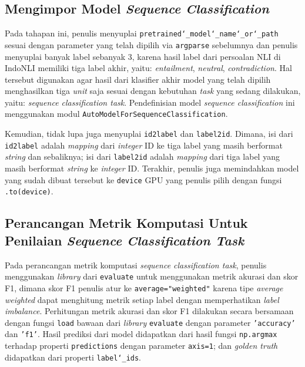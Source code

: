 \subsection{Mengimpor Model \emph{Sequence Classification}}
Pada tahapan ini, penulis menyuplai \texttt{pretrained\char`_model\char`_name\char`_or\char`_path} sesuai dengan parameter yang telah dipilih via \texttt{argparse} sebelumnya dan penulis menyuplai banyak label sebanyak 3, karena hasil label dari persoalan NLI di IndoNLI memiliki tiga label akhir, yaitu: \emph{entailment}, \emph{neutral}, \emph{contradiction}. Hal tersebut digunakan agar hasil dari klasifier akhir model yang telah dipilih menghasilkan tiga \emph{unit} saja sesuai dengan kebutuhan \emph{task} yang sedang dilakukan, yaitu: \emph{sequence classification task}. Pendefinisian model \emph{sequence classification} ini menggunakan modul \texttt{AutoModelForSequenceClassification}.

Kemudian, tidak lupa juga menyuplai \texttt{id2label} dan \texttt{label2id}. Dimana, isi dari \texttt{id2label} adalah \emph{mapping} dari \emph{integer} ID ke tiga label yang masih berformat \emph{string} dan sebaliknya; isi dari \texttt{label2id} adalah \emph{mapping} dari tiga label yang masih berformat \emph{string} ke \emph{integer} ID. Terakhir, penulis juga memindahkan model yang sudah dibuat tersebut ke \texttt{device} GPU yang penulis pilih dengan fungsi \texttt{.to(device)}.

\subsection{Perancangan Metrik Komputasi Untuk Penilaian \emph{Sequence Classification Task}}
Pada perancangan metrik komputasi \emph{sequence classification task}, penulis menggunakan \emph{library} dari \texttt{evaluate} untuk menggunakan metrik akurasi dan skor F1, dimana skor F1 penulis atur ke \texttt{average="weighted"} karena tipe \emph{average weighted} dapat menghitung metrik setiap label dengan memperhatikan \emph{label imbalance}. Perhitungan metrik akurasi dan skor F1 dilakukan secara bersamaan dengan fungsi \texttt{load} bawaan dari \emph{library} \texttt{evaluate} dengan parameter \texttt{'accuracy'} dan \texttt{'f1'}. Hasil prediksi dari model didapatkan dari hasil fungsi \texttt{np.argmax} terhadap properti \texttt{predictions} dengan parameter \texttt{axis=1}; dan \emph{golden truth} didapatkan dari properti \texttt{label\char`_ids}.

